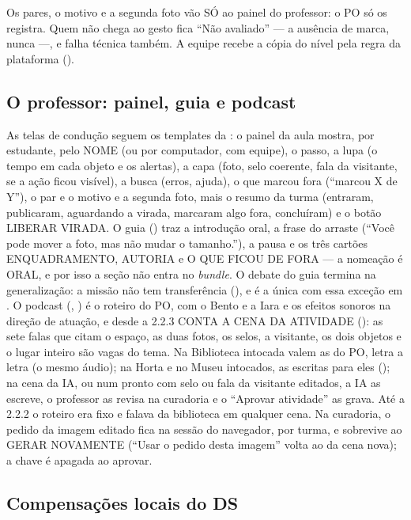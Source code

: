 Os pares, o motivo e a segunda foto vão SÓ ao painel do professor: o PO só os
registra. Quem não chega ao gesto fica \enquote{Não avaliado} --- a ausência
de marca, nunca  ---, e falha técnica também. A equipe
recebe a cópia do nível pela regra da plataforma ().

\subsection{O professor: painel, guia e podcast}

As telas de condução seguem os templates da : o painel da aula
mostra, por estudante, pelo NOME (ou por computador, com equipe), o passo, a
lupa (o tempo em cada objeto e os alertas), a capa (foto, selo coerente, fala
da visitante, se a ação ficou visível), a busca (erros, ajuda), o que marcou
fora (\enquote{marcou X de Y}), o par e o motivo e a segunda foto, mais o
resumo da turma (entraram, publicaram, aguardando a virada, marcaram algo
fora, concluíram) e o botão LIBERAR VIRADA. O guia
() traz a introdução oral, a frase do
arraste (\enquote{Você pode mover a foto, mas não mudar o tamanho.}), a pausa
e os três cartões ENQUADRAMENTO, AUTORIA e O QUE FICOU DE FORA --- a nomeação
é ORAL, e por isso a seção  não entra no \emph{bundle}. O debate do guia termina na generalização: a missão não tem transferência
(), e é a única com essa exceção em
. O podcast
(, ) é o roteiro do PO, com o Bento e a Iara
e os efeitos sonoros na direção de atuação, e desde a 2.2.3 CONTA A CENA DA
ATIVIDADE (): as sete falas que citam o espaço, as duas fotos,
os selos, a visitante, os dois objetos e o lugar inteiro são vagas do tema.
Na Biblioteca intocada valem as do PO, letra a letra (o mesmo áudio); na Horta
e no Museu intocados, as escritas para eles ();
na cena da IA, ou num pronto com selo ou fala da visitante editados, a IA as
escreve, o professor as revisa na curadoria e o \enquote{Aprovar atividade}
as grava. Até a 2.2.2 o roteiro era fixo e falava da biblioteca em qualquer
cena. Na curadoria, o pedido da imagem editado fica na sessão do navegador,
por turma, e sobrevive ao GERAR NOVAMENTE (\enquote{Usar o pedido desta
imagem} volta ao da cena nova); a chave é apagada ao aprovar.

\subsection{Compensações locais do DS}

